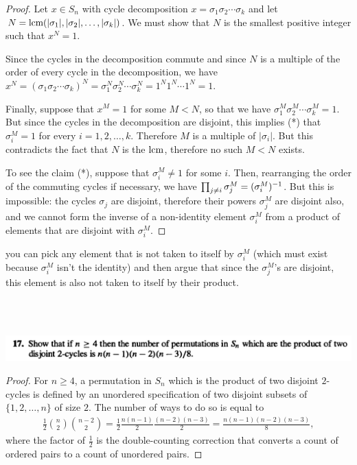 \begin{proof}
  Let $x \in S_n$ with cycle decomposition $x = \sigma_1\sigma_2\cdots\sigma_k$ and
  let $N = \text{lcm}(|\sigma_1|, |\sigma_2|, \ldots, |\sigma_k|)$. We must show that $N$ is the smallest positive integer
  such that $x^N = 1$.

  Since the cycles in the decomposition commute and since $N$ is a multiple of the order of every
  cycle in the decomposition, we have $x^N = (\sigma_1\sigma_2\cdots\sigma_k)^N = \sigma_1^N\sigma_2^N\cdots\sigma_k^N = 1^N1^N\cdots1^N = 1$.

  Finally, suppose that $x^M = 1$ for some $M < N$, so that we have
  $\sigma_1^M\sigma_2^M\cdots\sigma_k^M = 1$. But since the cycles in the decomposition are disjoint, this implies (*)
  that $\sigma_i^M = 1$ for every $i = 1, 2, \ldots, k$. Therefore $M$ is a multiple of
  $|\sigma_i|$. But this contradicts the fact that $N$ is the $\text{lcm}$, therefore no such $M < N$ exists.

  To see the claim (*), suppose that $\sigma_i^M \neq 1$ for some $i$. Then, rearranging the order of the
  commuting cycles if necessary, we have $\prod_{j \neq i}\sigma_j^M = (\sigma_i^M)^{-1}$. But this is impossible: the
  cycles $\sigma_j$ are disjoint, therefore their powers $\sigma_j^M$ are disjoint also, and we cannot form
  the inverse of a non-identity element $\sigma_i^M$ from a product of elements that are disjoint
  with $\sigma_i^M$.
\end{proof}

you can pick any element that is not taken to itself by $\sigma_i^M$ (which must exist because
$\sigma_i^M$ isn't the identity) and then argue that since the $\sigma_j^M$'s are disjoint, this element is
also not taken to itself by their product.



~\\~\\
\begin{mdframed}
\includegraphics[width=400pt]{img/algebra--nf--2-b38d.png}
\end{mdframed}

\begin{proof}
  For $n \geq 4$, a permutation in $S_n$ which is the product of two disjoint $2$-cycles is defined by
  an unordered specification of two disjoint subsets of $\{1, 2, \ldots, n\}$ of size $2$. The number of
  ways to do so is equal to
  \begin{align*}
    \frac{1}{2}{n \choose 2}{n - 2 \choose 2} = \frac{1}{2}\frac{n(n-1)}{2}\frac{(n-2)(n-3)}{2} = \frac{n(n-1)(n-2)(n-3)}{8},
  \end{align*}
  where the factor of $\frac{1}{2}$ is the double-counting correction that converts a count of
  ordered pairs to a count of unordered pairs.
\end{proof}




